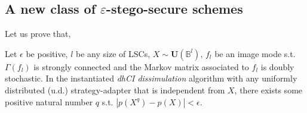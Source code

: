\documentclass{comjnl}
\begin{document}
\subsection{A new class of $\varepsilon$-stego-secure schemes}

Let us prove that,
\begin{theorem}\label{th:stego}
Let $\epsilon$ be positive,
$l$ be any size of LSCs, 
$X   \sim \mathbf{U}\left(\mathbb{B}^l\right)$,
$f_l$ be an image mode s.t. 
$\Gamma(f_l)$ is strongly connected and 
the Markov matrix associated to $f_l$ 
is doubly stochastic. 
In the instantiated \emph{dhCI dissimulation} algorithm 
with any uniformly distributed (u.d.) strategy-adapter 
that is independent from $X$,  
there exists some positive natural number $q$ s.t.
$|p(X^q)- p(X)| < \epsilon$. 
\end{theorem}
\end{document}
